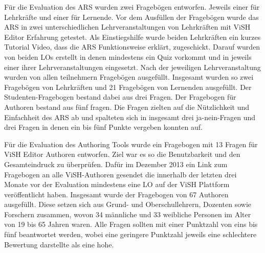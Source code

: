 \documentclass[conference]{IEEEtran}
\begin{document}
Für die Evaluation des ARS wurden zwei Fragebögen entworfen. Jeweils einer für Lehrkräfte und einer für Lernende. Vor dem Ausfüllen der Fragebögen wurde das ARS in zwei unterschiedlichen Lehrveranstaltungen von Lehrkräften mit ViSH Editor Erfahrung getestet. Als Einstiegshilfe wurde beiden Lehrkräften ein kurzes Tutorial Video, dass die ARS Funktionsweise erklärt, zugeschickt. Darauf wurden von beiden LOs erstellt in denen mindestens ein Quiz vorkommt und in jeweils einer ihrer Lehrveranstaltungen eingesetzt. Nach der jeweiligen Lehrveranstaltung wurden von allen teilnehmern Fragebögen ausgefüllt. Insgesamt wurden so zwei Fragebögen von Lehrkräften und 21 Fragebögen von Lernenden ausgefüllt. Der Studenten-Fragebogen bestand dabei aus drei Fragen. Der Fragebogen für Authoren bestand aus fünf fragen. Die Fragen zielten auf die Nützlichkeit und Einfachheit des ARS ab und spalteten sich in insgesamt drei ja-nein-Fragen und drei Fragen in denen ein bis fünf Punkte vergeben konnten auf. \cite[p. 7]{Gordillo2015}

Für die Evaluation des Authoring Tools wurde ein Fragebogen mit 13 Fragen für ViSH Editor Authoren entworfen. Ziel war es so die Benutzbarkeit und den Gesamteindruck zu überprüfen. Dafür im Dezember 2013 ein Link zum Fragebogen an alle ViSH-Authoren gesendet die innerhalb der letzten drei Monate vor der Evaluation mindestens eine LO auf der ViSH Plattform veröffentlicht haben. Insgesamt wurde der Fragebogen von 67 Authoren ausgefüllt. Diese setzen sich aus Grund- und Oberschullehrern, Dozenten sowie Forschern zusammen, wovon 34 männliche und 33 weibliche Personen im Alter von 19 bis 65 Jahren waren. Alle Fragen sollten mit einer Punktzahl von eins bis fünf beantwortet werden, wobei eine geringere Punktzahl jeweils eine schlechtere Bewertung darstellte als eine hohe. \cite[p. 5]{Gordillo2015}
\end{document}
